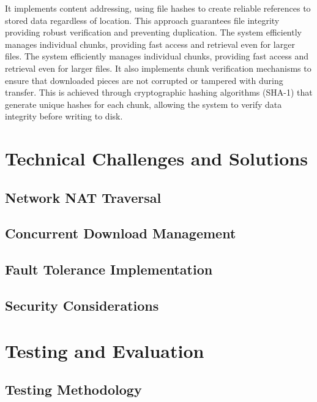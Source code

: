 \documentclass[12pt,a4paper]{report}
\begin{document}
It implements content addressing, using file hashes to create reliable references to stored data regardless of location. This approach guarantees file integrity providing robust verification and preventing duplication. The system efficiently manages individual chunks, providing fast access and retrieval even for larger files. The system efficiently manages individual chunks, providing fast access and retrieval even for larger files. It also implements chunk verification mechanisms to ensure that downloaded pieces are not corrupted or tampered with during transfer. This is achieved through cryptographic hashing algorithms (SHA-1) that generate unique hashes for each chunk, allowing the system to verify data integrity before writing to disk.

\chapter{Technical Challenges and Solutions}
\section{Network NAT Traversal}

\section{Concurrent Download Management}

\section{Fault Tolerance Implementation}

\section{Security Considerations}

\chapter{Testing and Evaluation}
\section{Testing Methodology}
\end{document}
